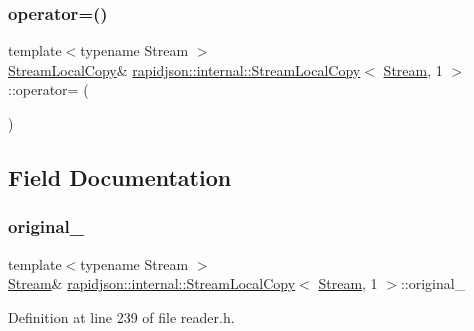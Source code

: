 \subsubsection{\texorpdfstring{operator=()}{operator=()}}
{\footnotesize\ttfamily template$<$typename Stream $>$ \\
\mbox{\hyperlink{classrapidjson_1_1internal_1_1_stream_local_copy}{Stream\+Local\+Copy}}\& \mbox{\hyperlink{classrapidjson_1_1internal_1_1_stream_local_copy}{rapidjson\+::internal\+::\+Stream\+Local\+Copy}}$<$ \mbox{\hyperlink{classrapidjson_1_1_stream}{Stream}}, 1 $>$\+::operator= (\begin{DoxyParamCaption}\item[{const \mbox{\hyperlink{classrapidjson_1_1internal_1_1_stream_local_copy}{Stream\+Local\+Copy}}$<$ \mbox{\hyperlink{classrapidjson_1_1_stream}{Stream}}, 1 $>$ \&}]{ }\end{DoxyParamCaption})\hspace{0.3cm}{\ttfamily [private]}}



\subsection{Field Documentation}
\mbox{\label{classrapidjson_1_1internal_1_1_stream_local_copy_3_01_stream_00_011_01_4_a3b73b7aa82e8514ed165d0abc89c3137}} 
\subsubsection{\texorpdfstring{original\_}{original\_}}
{\footnotesize\ttfamily template$<$typename Stream $>$ \\
\mbox{\hyperlink{classrapidjson_1_1_stream}{Stream}}\& \mbox{\hyperlink{classrapidjson_1_1internal_1_1_stream_local_copy}{rapidjson\+::internal\+::\+Stream\+Local\+Copy}}$<$ \mbox{\hyperlink{classrapidjson_1_1_stream}{Stream}}, 1 $>$\+::original\+\_\+\hspace{0.3cm}{\ttfamily [private]}}



Definition at line 239 of file reader.\+h.

